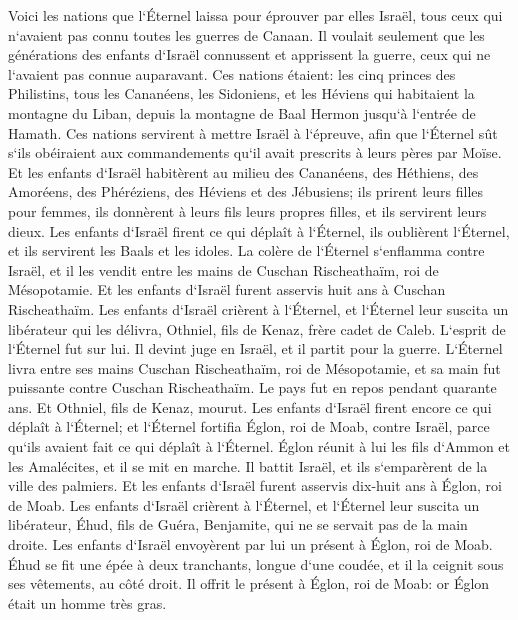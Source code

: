 \verse Voici les nations que l`Éternel laissa pour éprouver par elles Israël, tous ceux qui n`avaient pas connu toutes les guerres de Canaan. 
\verse Il voulait seulement que les générations des enfants d`Israël connussent et apprissent la guerre, ceux qui ne l`avaient pas connue auparavant. 
\verse Ces nations étaient: les cinq princes des Philistins, tous les Cananéens, les Sidoniens, et les Héviens qui habitaient la montagne du Liban, depuis la montagne de Baal Hermon jusqu`à l`entrée de Hamath. 
\verse Ces nations servirent à mettre Israël à l`épreuve, afin que l`Éternel sût s`ils obéiraient aux commandements qu`il avait prescrits à leurs pères par Moïse. 
\verse Et les enfants d`Israël habitèrent au milieu des Cananéens, des Héthiens, des Amoréens, des Phéréziens, des Héviens et des Jébusiens; 
\verse ils prirent leurs filles pour femmes, ils donnèrent à leurs fils leurs propres filles, et ils servirent leurs dieux. 
\verse Les enfants d`Israël firent ce qui déplaît à l`Éternel, ils oublièrent l`Éternel, et ils servirent les Baals et les idoles. 
\verse La colère de l`Éternel s`enflamma contre Israël, et il les vendit entre les mains de Cuschan Rischeathaïm, roi de Mésopotamie. Et les enfants d`Israël furent asservis huit ans à Cuschan Rischeathaïm. 
\verse Les enfants d`Israël crièrent à l`Éternel, et l`Éternel leur suscita un libérateur qui les délivra, Othniel, fils de Kenaz, frère cadet de Caleb. 
\verse L`esprit de l`Éternel fut sur lui. Il devint juge en Israël, et il partit pour la guerre. L`Éternel livra entre ses mains Cuschan Rischeathaïm, roi de Mésopotamie, et sa main fut puissante contre Cuschan Rischeathaïm. 
\verse Le pays fut en repos pendant quarante ans. Et Othniel, fils de Kenaz, mourut. 
\verse Les enfants d`Israël firent encore ce qui déplaît à l`Éternel; et l`Éternel fortifia Églon, roi de Moab, contre Israël, parce qu`ils avaient fait ce qui déplaît à l`Éternel. 
\verse Églon réunit à lui les fils d`Ammon et les Amalécites, et il se mit en marche. Il battit Israël, et ils s`emparèrent de la ville des palmiers. 
\verse Et les enfants d`Israël furent asservis dix-huit ans à Églon, roi de Moab. 
\verse Les enfants d`Israël crièrent à l`Éternel, et l`Éternel leur suscita un libérateur, Éhud, fils de Guéra, Benjamite, qui ne se servait pas de la main droite. Les enfants d`Israël envoyèrent par lui un présent à Églon, roi de Moab. 
\verse Éhud se fit une épée à deux tranchants, longue d`une coudée, et il la ceignit sous ses vêtements, au côté droit. 
\verse Il offrit le présent à Églon, roi de Moab: or Églon était un homme très gras. 
